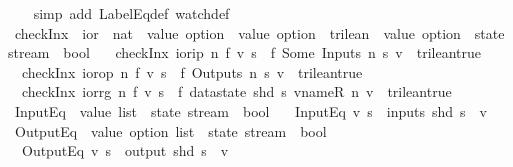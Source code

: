 \begin{isabellebody}
%
\isadelimproof
\ \ %
\endisadelimproof
%
\isatagproof
{}\isamarkupfalse%
\ {\isacharparenleft}simp\ add{\isacharcolon}\ LabelEq{\isacharunderscore}def\ watch{\isacharunderscore}def{\isacharparenright}%
\endisatagproof
{\isafoldproof}%
%
\isadelimproof
\isanewline
%
\endisadelimproof
\isanewline
{}\isamarkupfalse%
\ {\isachardoublequoteopen}checkInx{\isachardoublequoteclose}\ {\isacharcolon}{\isacharcolon}\ {\isachardoublequoteopen}ior\ {\isasymRightarrow}\ nat\ {\isasymRightarrow}\ {\isacharparenleft}value\ option\ {\isasymRightarrow}\ value\ option\ {\isasymRightarrow}\ trilean{\isacharparenright}\ {\isasymRightarrow}\ value\ option\ {\isasymRightarrow}\ state\ stream\ {\isasymRightarrow}\ bool{\isachardoublequoteclose}\ \isanewline
\ \ {\isachardoublequoteopen}checkInx\ ior{\isachardot}ip\ n\ f\ v\ s\ {\isacharequal}\ {\isacharparenleft}f\ {\isacharparenleft}Some\ {\isacharparenleft}Inputs\ {\isacharparenleft}n{\isacharminus}{}{\isacharparenright}\ s{\isacharparenright}{\isacharparenright}\ v\ {\isacharequal}\ trilean{\isachardot}true{\isacharparenright}{\isachardoublequoteclose}\ {\isacharbar}\isanewline
\ \ {\isachardoublequoteopen}checkInx\ ior{\isachardot}op\ n\ f\ v\ s\ {\isacharequal}\ {\isacharparenleft}f\ {\isacharparenleft}Outputs\ n\ s{\isacharparenright}\ v\ {\isacharequal}\ trilean{\isachardot}true{\isacharparenright}{\isachardoublequoteclose}\ {\isacharbar}\isanewline
\ \ {\isachardoublequoteopen}checkInx\ ior{\isachardot}rg\ n\ f\ v\ s\ {\isacharequal}\ {\isacharparenleft}f\ {\isacharparenleft}datastate\ {\isacharparenleft}shd\ s{\isacharparenright}\ {\isacharparenleft}vname{\isachardot}R\ n{\isacharparenright}{\isacharparenright}\ v\ {\isacharequal}\ trilean{\isachardot}true{\isacharparenright}{\isachardoublequoteclose}\isanewline
\isanewline
{}\isamarkupfalse%
\ InputEq\ {\isacharcolon}{\isacharcolon}\ {\isachardoublequoteopen}value\ list\ {\isasymRightarrow}\ state\ stream\ {\isasymRightarrow}\ bool{\isachardoublequoteclose}\ \isanewline
\ \ {\isachardoublequoteopen}InputEq\ v\ s\ {\isasymequiv}\ inputs\ {\isacharparenleft}shd\ s{\isacharparenright}\ {\isacharequal}\ v{\isachardoublequoteclose}\isanewline
\isanewline
{}\isamarkupfalse%
\ OutputEq\ {\isacharcolon}{\isacharcolon}\ {\isachardoublequoteopen}value\ option\ list\ {\isasymRightarrow}\ state\ stream\ {\isasymRightarrow}\ bool{\isachardoublequoteclose}\ \isanewline
\ \ {\isachardoublequoteopen}OutputEq\ v\ s\ {\isasymequiv}\ output\ {\isacharparenleft}shd\ s{\isacharparenright}\ {\isacharequal}\ v{\isachardoublequoteclose}\isanewline

\end{isabellebody}
